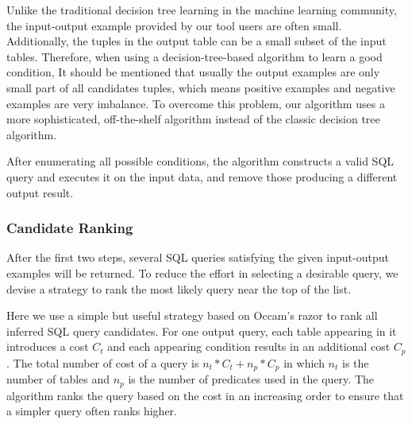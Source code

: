 Unlike the traditional decision tree learning in the machine learning community,
the input-output example provided by our tool users are often small. Additionally,
the tuples in the output table can be a small subset of the input tables.
Therefore, when using a decision-tree-based algorithm to learn a good condition,
It should be mentioned that usually the output examples are only small part of all candidates tuples, which means positive examples and negative examples are very imbalance. 
To overcome this problem, our algorithm uses a more sophisticated, off-the-shelf algorithm\cite{Chris:2003} instead of the classic decision tree algorithm.

 

After enumerating all possible conditions, the algorithm constructs a valid SQL query and executes it on the input data, and remove those producing a different output result.


\subsubsection{Candidate Ranking}
\label{sec:ranking}

After the first two steps, several SQL queries satisfying the given input-output examples
will be returned. To reduce the effort in selecting a desirable query, we devise a strategy
to rank the most likely query near the top of the list.

Here we use a simple but useful strategy based on Occam's razor to rank all inferred SQL query candidates.
For one output query, each table appearing in it introduces a cost $C_t$ and each appearing condition 
results in an additional cost $C_p$. The total number of cost of a query is $n_t*C_t+n_p*C_p$ in which
$n_t$ is the number of tables and $n_p$ is the number of predicates used in the query. The algorithm
ranks the query based on the cost in an increasing order to ensure that a simpler query often ranks higher.


